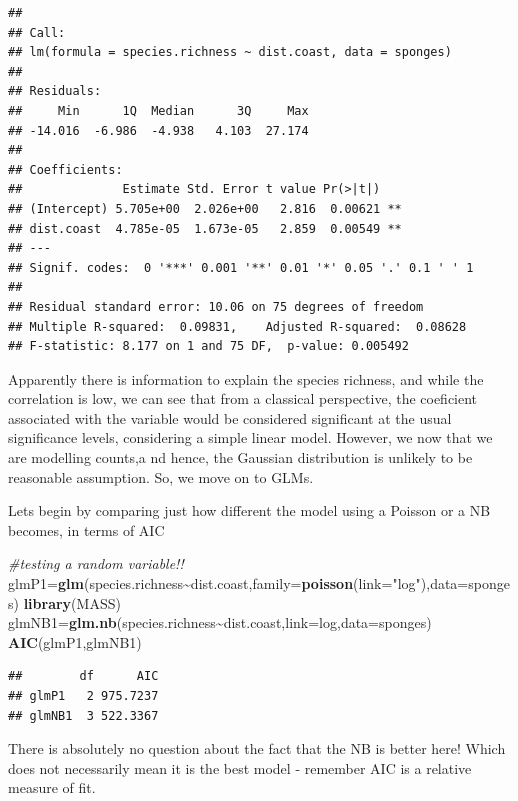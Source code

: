 \documentclass[
]{book}
\newenvironment{Shaded}{\begin{snugshade}}{\end{snugshade}}
\newcommand{\AttributeTok}[1]{\textcolor[rgb]{0.13,0.29,0.53}{#1}}
\newcommand{\CommentTok}[1]{\textcolor[rgb]{0.56,0.35,0.01}{\textit{#1}}}
\newcommand{\FunctionTok}[1]{\textcolor[rgb]{0.13,0.29,0.53}{\textbf{#1}}}
\newcommand{\NormalTok}[1]{#1}
\newcommand{\OtherTok}[1]{\textcolor[rgb]{0.56,0.35,0.01}{#1}}
\newcommand{\SpecialCharTok}[1]{\textcolor[rgb]{0.81,0.36,0.00}{\textbf{#1}}}
\newcommand{\StringTok}[1]{\textcolor[rgb]{0.31,0.60,0.02}{#1}}
\begin{document}
\begin{verbatim}
## 
## Call:
## lm(formula = species.richness ~ dist.coast, data = sponges)
## 
## Residuals:
##     Min      1Q  Median      3Q     Max 
## -14.016  -6.986  -4.938   4.103  27.174 
## 
## Coefficients:
##              Estimate Std. Error t value Pr(>|t|)   
## (Intercept) 5.705e+00  2.026e+00   2.816  0.00621 **
## dist.coast  4.785e-05  1.673e-05   2.859  0.00549 **
## ---
## Signif. codes:  0 '***' 0.001 '**' 0.01 '*' 0.05 '.' 0.1 ' ' 1
## 
## Residual standard error: 10.06 on 75 degrees of freedom
## Multiple R-squared:  0.09831,    Adjusted R-squared:  0.08628 
## F-statistic: 8.177 on 1 and 75 DF,  p-value: 0.005492
\end{verbatim}

Apparently there is information to explain the species richness, and while the correlation is low, we can see that from a classical perspective, the coeficient associated with the variable would be considered significant at the usual significance levels, considering a simple linear model. However, we now that we are modelling counts,a nd hence, the Gaussian distribution is unlikely to be reasonable assumption. So, we move on to GLMs.

Lets begin by comparing just how different the model using a Poisson or a NB becomes, in terms of AIC

\begin{Shaded}
\begin{Highlighting}[]
\CommentTok{\#testing a random variable!!}
\NormalTok{glmP1}\OtherTok{=}\FunctionTok{glm}\NormalTok{(species.richness}\SpecialCharTok{\textasciitilde{}}\NormalTok{dist.coast,}\AttributeTok{family=}\FunctionTok{poisson}\NormalTok{(}\AttributeTok{link=}\StringTok{"log"}\NormalTok{),}\AttributeTok{data=}\NormalTok{sponges)}
\FunctionTok{library}\NormalTok{(MASS)}
\NormalTok{glmNB1}\OtherTok{=}\FunctionTok{glm.nb}\NormalTok{(species.richness}\SpecialCharTok{\textasciitilde{}}\NormalTok{dist.coast,}\AttributeTok{link=}\NormalTok{log,}\AttributeTok{data=}\NormalTok{sponges)}
\FunctionTok{AIC}\NormalTok{(glmP1,glmNB1)}
\end{Highlighting}
\end{Shaded}

\begin{verbatim}
##        df      AIC
## glmP1   2 975.7237
## glmNB1  3 522.3367
\end{verbatim}

There is absolutely no question about the fact that the NB is better here! Which does not necessarily mean it is the best model - remember AIC is a relative measure of fit.
\end{document}
